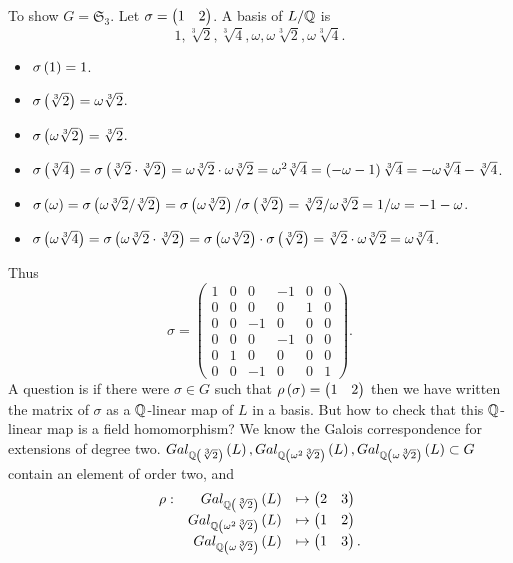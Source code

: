 \begin{example1}
To show $ G = \mathfrak{S}_3 $. Let $ \sigma = \onebytwo{1}{2} $. A basis of $ L / \Q $ is
$$ 1, \sqrt[3]{2}, \sqrt[3]{4}, \omega, \omega\sqrt[3]{2}, \omega\sqrt[3]{4}. $$
\begin{itemize}
\item $ \sigma\rb{1} = 1 $.
\item $ \sigma\rb{\sqrt[3]{2}} = \omega\sqrt[3]{2} $.
\item $ \sigma\rb{\omega\sqrt[3]{2}} = \sqrt[3]{2} $.
\item $ \sigma\rb{\sqrt[3]{4}} = \sigma\rb{\sqrt[3]{2} \cdot \sqrt[3]{2}} = \omega\sqrt[3]{2} \cdot \omega\sqrt[3]{2} = \omega^2\sqrt[3]{4} = \rb{-\omega - 1}\sqrt[3]{4} = -\omega\sqrt[3]{4} - \sqrt[3]{4} $.
\item $ \sigma\rb{\omega} = \sigma\rb{\omega\sqrt[3]{2} / \sqrt[3]{2}} = \sigma\rb{\omega\sqrt[3]{2}} / \sigma\rb{\sqrt[3]{2}} = \sqrt[3]{2} / \omega\sqrt[3]{2} = 1 / \omega = -1 - \omega $.
\item $ \sigma\rb{\omega\sqrt[3]{4}} = \sigma\rb{\omega\sqrt[3]{2} \cdot \sqrt[3]{2}} = \sigma\rb{\omega\sqrt[3]{2}} \cdot \sigma\rb{\sqrt[3]{2}} = \sqrt[3]{2} \cdot \omega\sqrt[3]{2} = \omega\sqrt[3]{4} $.
\end{itemize}
Thus
$$ \sigma =
\begin{pmatrix}
1 & 0 & 0 & -1 & 0 & 0 \\
0 & 0 & 0 & 0 & 1 & 0 \\
0 & 0 & -1 & 0 & 0 & 0 \\
0 & 0 & 0 & -1 & 0 & 0 \\
0 & 1 & 0 & 0 & 0 & 0 \\
0 & 0 & -1 & 0 & 0 & 1
\end{pmatrix}.
$$
A question is if there were $ \sigma \in G $ such that $ \rho\rb{\sigma} = \onebytwo{1}{2} $ then we have written the matrix of $ \sigma $ as a $ \Q $-linear map of $ L $ in a basis. But how to check that this $ \Q $-linear map is a field homomorphism? We know the Galois correspondence for extensions of degree two. $ Gal_{\Q\rb{\sqrt[3]{2}}}\rb{L}, Gal_{\Q\rb{\omega^2\sqrt[3]{2}}}\rb{L}, Gal_{\Q\rb{\omega\sqrt[3]{2}}}\rb{L} \subset G $ contain an element of order two, and
$$
\begin{array}{rrl}
\rho : & Gal_{\Q\rb{\sqrt[3]{2}}}\rb{L} & \mapsto \onebytwo{2}{3} \\
& Gal_{\Q\rb{\omega^2\sqrt[3]{2}}}\rb{L} & \mapsto \onebytwo{1}{2} \\
& Gal_{\Q\rb{\omega\sqrt[3]{2}}}\rb{L} & \mapsto \onebytwo{1}{3}.

\end{array}$$
\end{example1}
